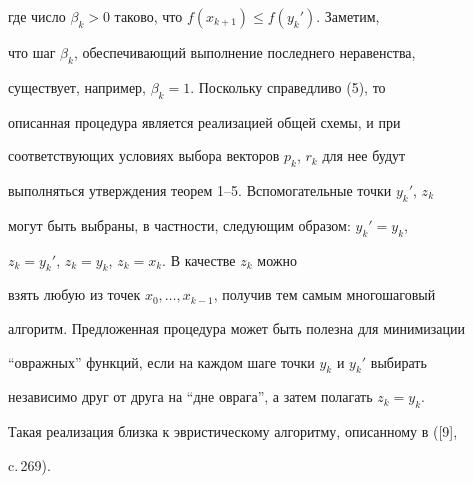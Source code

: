 где число $\beta_k>0$ таково, что $f(x_{k+1})\le f({y_k}')$. Заметим,


что шаг $\beta_k$, обеспечивающий выполнение последнего неравенства,


существует, например, $\beta_k=1$. Поскольку справедливо (5), то


описанная процедура является реализацией общей схемы, и при


соответствующих условиях выбора векторов $p_k$, $r_k$ для нее будут


выполняться утверждения теорем 1--5. Вспомогательные точки ${y_k}'$, $z_k$


могут быть выбраны, в частности, следующим образом: ${y_k}'=y_k$,


$z_k={y_k}'$, $z_k=y_k$, $z_k=x_k$. В качестве $z_k$ можно


взять любую из точек $x_0,\dotsc,x_{k-1}$, получив тем самым многошаговый


алгоритм. Предложенная процедура может быть полезна для минимизации


``овражных'' функций, если на каждом шаге точки $y_k$ и ${y_k}'$ выбирать


независимо друг от друга на ``дне оврага'', а затем полагать $z_k=y_k$.


Такая реализация близка к эвристическому алгоритму, описанному в ([9],


c.\,269).





